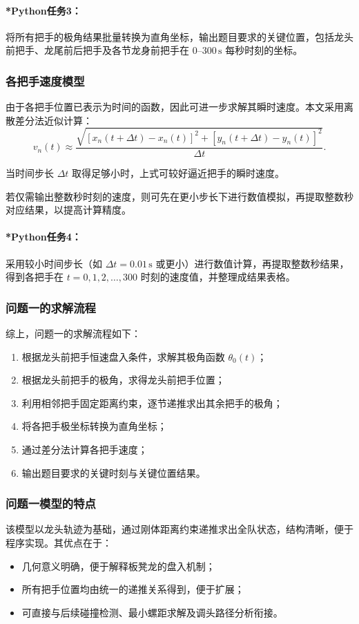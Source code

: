 \documentclass[12pt,a4paper]{ctexart}
\begin{document}
\paragraph{*Python任务3：}
将所有把手的极角结果批量转换为直角坐标，输出题目要求的关键位置，包括龙头前把手、龙尾前后把手及各节龙身前把手在 $0$--$300\,\mathrm{s}$ 每秒时刻的坐标。

\subsubsection{各把手速度模型}
由于各把手位置已表示为时间的函数，因此可进一步求解其瞬时速度。本文采用离散差分法近似计算：
\begin{equation}
v_n(t)\approx
\frac{\sqrt{\left[x_n(t+\Delta t)-x_n(t)\right]^2+\left[y_n(t+\Delta t)-y_n(t)\right]^2}}{\Delta t}.
\end{equation}

当时间步长 $\Delta t$ 取得足够小时，上式可较好逼近把手的瞬时速度。

若仅需输出整数秒时刻的速度，则可先在更小步长下进行数值模拟，再提取整数秒对应结果，以提高计算精度。

\paragraph{*Python任务4：}
采用较小时间步长（如 $\Delta t=0.01\,\mathrm{s}$ 或更小）进行数值计算，再提取整数秒结果，得到各把手在 $t=0,1,2,\dots,300$ 时刻的速度值，并整理成结果表格。

\subsubsection{问题一的求解流程}
综上，问题一的求解流程如下：

\begin{enumerate}
    \item 根据龙头前把手恒速盘入条件，求解其极角函数 $\theta_0(t)$；
    \item 根据龙头前把手的极角，求得龙头前把手位置；
    \item 利用相邻把手固定距离约束，逐节递推求出其余把手的极角；
    \item 将各把手极坐标转换为直角坐标；
    \item 通过差分法计算各把手速度；
    \item 输出题目要求的关键时刻与关键位置结果。
\end{enumerate}

\subsubsection{问题一模型的特点}
该模型以龙头轨迹为基础，通过刚体距离约束递推求出全队状态，结构清晰，便于程序实现。其优点在于：
\begin{itemize}
    \item 几何意义明确，便于解释板凳龙的盘入机制；
    \item 所有把手位置均由统一的递推关系得到，便于扩展；
    \item 可直接与后续碰撞检测、最小螺距求解及调头路径分析衔接。
\end{itemize}
\end{document}

